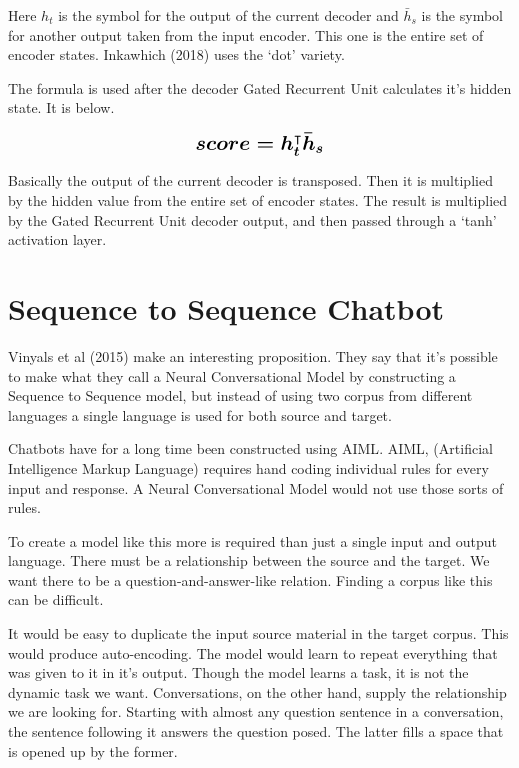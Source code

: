 Here $h_t$ is the symbol for the output of the current decoder and $\bar{h}_s $ is the symbol for another output taken from the input encoder. This one is the entire set of encoder states. Inkawhich (2018)\cite{2018Inkawhich} uses the `dot' variety.

The formula is used after the decoder Gated Recurrent Unit calculates it's hidden state. It is below.

$$ 
\boldmath
\mathlarger{ \mathlarger{
score = h_t^\intercal \bar{h}_s 
} }
\unboldmath
$$ 

Basically the output of the current decoder is transposed. Then it is multiplied by the hidden value from the entire set of encoder states. The result is multiplied by the Gated Recurrent Unit decoder output, and then passed through a `tanh' activation layer.

\section{Sequence to Sequence Chatbot}

Vinyals et al (2015)\cite{DBLP:journals/corr/VinyalsL15} make an interesting proposition. They say that it's possible to make what they call a Neural Conversational Model by constructing a Sequence to Sequence model, but instead of using two corpus from different languages a single language is used for both source and target.

Chatbots have for a long time been constructed using \ac{AIML}. AIML, (Artificial Intelligence Markup Language) requires hand coding individual rules for every input and response. A Neural Conversational Model would not use those sorts of rules.

To create a model like this more is required than just a single input and output language. There must be a relationship between the source and the target. We want there to be a question-and-answer-like relation. Finding a corpus like this can be difficult.

It would be easy to duplicate the input source material in the target corpus. This would produce auto-encoding. The model would learn to repeat everything that was given to it in it's output. Though the model learns a task, it is not the dynamic task we want. Conversations, on the other hand, supply the relationship we are looking for. Starting with almost any question sentence in a conversation, the sentence following it answers the question posed. The latter fills a space that is opened up by the former. 

